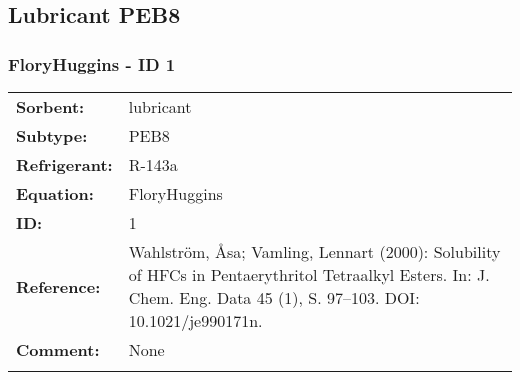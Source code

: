 \subsection{Lubricant PEB8}
%
\subsubsection{FloryHuggins - ID 1}
%
\begin{tabular}[l]{|lp{11.5cm}|}
\hline
\addlinespace

\textbf{Sorbent:} & lubricant \\
\textbf{Subtype:} & PEB8 \\
\textbf{Refrigerant:} & R-143a \\
\textbf{Equation:} & FloryHuggins \\
\textbf{ID:} & 1 \\
\textbf{Reference:} & Wahlström, Åsa; Vamling, Lennart (2000): Solubility of HFCs in Pentaerythritol Tetraalkyl Esters. In: J. Chem. Eng. Data 45 (1), S. 97–103. DOI: 10.1021/je990171n. \\
\textbf{Comment:} & None \\

\addlinespace
\hline
\end{tabular}
\newline

